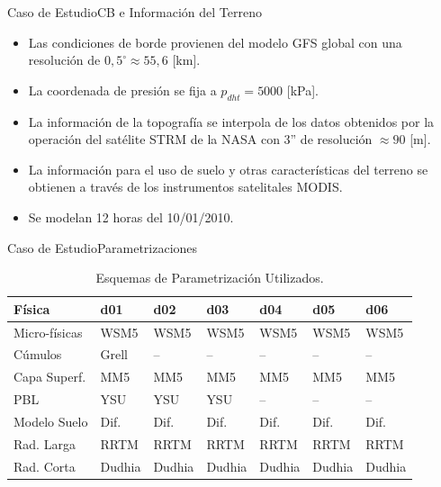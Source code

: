 \documentclass[mathserif]{beamer}
\begin{document}
\begin{frame}{Caso de Estudio}{CB e Información del Terreno}
	\begin{itemize}\justifying
		\item Las condiciones de borde provienen del modelo GFS global con una resolución de $0,5^\circ \approx 55,6$ [km].
		\item La coordenada de presión se fija a $p_{dht} = 5000$ [kPa].
		\item La información de la topografía se interpola de los datos obtenidos por la operación del satélite STRM de la NASA con 3'' de resolución $\approx 90$ [m].
		\item La información para el uso de suelo y otras características del terreno se obtienen a través de los instrumentos satelitales MODIS.
		\item Se modelan 12 horas del 10/01/2010.
	\end{itemize}
\end{frame}

\begin{frame}{Caso de Estudio}{Parametrizaciones}
\begin{table}[h!]
	\caption{Esquemas de Parametrización Utilizados.}\label{tab:esquemas}
	\centering
	{\footnotesize \begin{tabular}{lllllll}
		\toprule
		Física 					& d01	&	d02	&	d03	&	d04	&	d05	&	d06 \\
		\midrule
		Micro-físicas		 	& WSM5 & WSM5 & WSM5 &WSM5&WSM5&WSM5  \\
		Cúmulos			 		& Grell & -- & -- & -- & -- & -- \\ 
		Capa Superf.	 	& MM5 & MM5 & MM5 & MM5 & MM5 & MM5 \\
		PBL				 		& YSU & YSU & YSU & -- & -- & -- \\
		Modelo Suelo 		& Dif. & Dif. & Dif. & Dif. & Dif. & Dif. 	\\
		Rad. Larga	& RRTM &RRTM&RRTM&RRTM&RRTM&RRTM \\
		Rad. Corta	& Dudhia &Dudhia&Dudhia&Dudhia&Dudhia&Dudhia \\
		\bottomrule
	\end{tabular}}
\end{table}
\end{frame}
\end{document}
